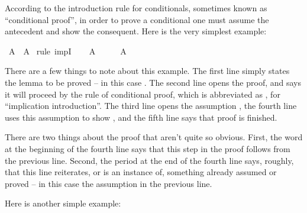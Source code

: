 \begin{isabellebody}
%
\isadelimdocument
%
\endisadelimdocument
%
\isatagdocument
%
\isamarkuptrue%
%
\endisatagdocument
{\isafolddocument}%
%
\isadelimdocument
%
\endisadelimdocument
%
\begin{isamarkuptext}%
According to the introduction rule for conditionals, sometimes known as ``conditional proof'',
in order to prove a conditional one must assume the antecedent and show the consequent. Here is the
very simplest example:%
\end{isamarkuptext}\isamarkuptrue%
\isamarkupfalse%
\ {\isachardoublequoteopen}A\ {\isasymlongrightarrow}\ A{\isachardoublequoteclose}\isanewline
%
\isadelimproof
%
\endisadelimproof
%
\isatagproof
{}\isamarkupfalse%
\ {\isacharparenleft}rule\ impI{\isacharparenright}\isanewline
\ \ \isamarkupfalse%
\ {\isachardoublequoteopen}A{\isachardoublequoteclose}\isanewline
\ \ \isamarkupfalse%
\ \isamarkupfalse%
\ {\isachardoublequoteopen}A{\isachardoublequoteclose}\isacommand{{\isachardot}}\isamarkupfalse%
\isanewline
{}\isamarkupfalse%
%
\endisatagproof
{\isafoldproof}%
%
\isadelimproof
%
\endisadelimproof
%
\begin{isamarkuptext}%
There are a few things to note about this example. The first line simply states the lemma to
be proved -- in this case . The second line opens the proof, and says it will proceed
by the rule of conditional proof, which is abbreviated as , for ``implication 
introduction''. The third line opens the assumption , the fourth line uses this assumption
to show , and the fifth line says that proof is finished.%
\end{isamarkuptext}\isamarkuptrue%
%
\begin{isamarkuptext}%
There are two things about the proof that aren't quite so obvious. First, the word 
at the beginning of the fourth line says that this step in the proof follows from the previous line.
Second, the period at the end of the fourth line says, roughly, that this line reiterates, or is an
instance of, something already assumed or proved -- in this case the assumption in the previous line.%
\end{isamarkuptext}\isamarkuptrue%
%
\begin{isamarkuptext}%
Here is another simple example:%
\end{isamarkuptext}\isamarkuptrue%
\isamarkupfalse%

\end{isabellebody}
